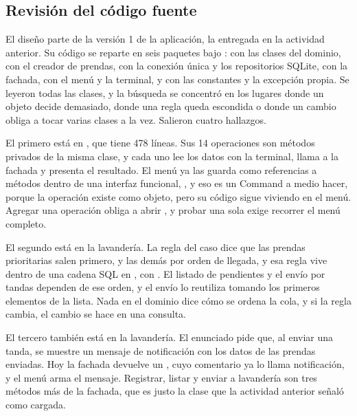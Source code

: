 %
%

\subsection{Revisión del código fuente}

El diseño parte de la versión 1 de la aplicación, la entregada en la actividad anterior. Su código se reparte en seis paquetes bajo :  con las clases del dominio,  con el creador de prendas,  con la conexión única y los repositorios SQLite,  con la fachada,  con el menú y la terminal, y  con las constantes y la excepción propia. Se leyeron todas las clases, y la búsqueda se concentró en los lugares donde un objeto decide demasiado, donde una regla queda escondida o donde un cambio obliga a tocar varias clases a la vez. Salieron cuatro hallazgos.

El primero está en , que tiene 478 líneas. Sus 14 operaciones son métodos privados de la misma clase, y cada uno lee los datos con la terminal, llama a la fachada y presenta el resultado. El menú ya las guarda como referencias a métodos dentro de una interfaz funcional, , y eso es un Command a medio hacer, porque la operación existe como objeto, pero su código sigue viviendo en el menú. Agregar una operación obliga a abrir , y probar una sola exige recorrer el menú completo.

El segundo está en la lavandería. La regla del caso dice que las prendas prioritarias salen primero, y las demás por orden de llegada, y esa regla vive dentro de una cadena SQL en , con . El listado de pendientes y el envío por tandas dependen de ese orden, y el envío lo reutiliza tomando los primeros elementos de la lista. Nada en el dominio dice cómo se ordena la cola, y si la regla cambia, el cambio se hace en una consulta.

El tercero también está en la lavandería. El enunciado pide que, al enviar una tanda, se muestre un mensaje de notificación con los datos de las prendas enviadas. Hoy la fachada devuelve un , cuyo comentario ya lo llama notificación, y el menú arma el mensaje. Registrar, listar y enviar a lavandería son tres métodos más de la fachada, que es justo la clase que la actividad anterior señaló como cargada.

